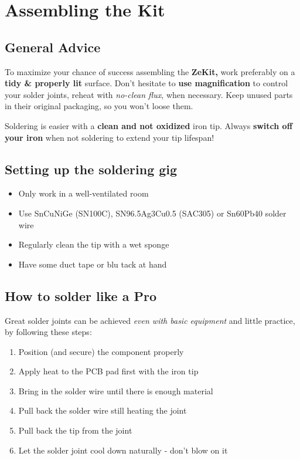 \documentclass{scrartcl}
\begin{document}
\section{Assembling the Kit}

\subsection{General Advice}

To maximize your chance of success assembling the \textbf{ZeKit,} work preferably on a \textbf{tidy \& properly lit} surface.
Don't hesitate to \textbf{use magnification} to control your solder joints, reheat with \emph{no-clean flux}, when necessary.
Keep unused parts in their original packaging, so you won't loose them.

Soldering is easier with a \textbf{clean and not oxidized} iron tip. Always \textbf{switch off your iron} when not soldering to extend your tip lifespan!

\subsection{Setting up the soldering gig}

\begin{itemize}
    \item Only work in a well-ventilated room
    \item Use SnCuNiGe (SN100C), SN96.5Ag3Cu0.5 (SAC305) or Sn60Pb40 solder wire
    \item Regularly clean the tip with a wet sponge
    \item Have some duct tape or blu tack at hand
\end{itemize}

\subsection{How to solder like a Pro}

Great solder joints can be achieved \emph{even with basic equipment} and little practice,\\
by following these steps:

\begin{enumerate}
    \item Position (and secure) the component properly
    \item Apply heat to the PCB pad first with the iron tip
    \item Bring in the solder wire until there is enough material
    \item Pull back the solder wire still heating the joint
    \item Pull back the tip from the joint
    \item Let the solder joint cool down naturally - don't blow on it
\end{enumerate}
\end{document}
